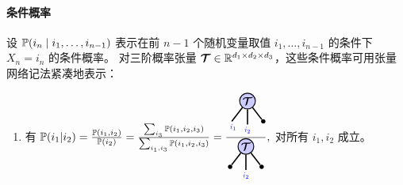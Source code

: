 \paragraph{条件概率}
设 
$\mathbb{P}(i_n \mid i_1, \dots, i_{n-1})
$
表示在前 $n-1$ 个随机变量取值 $i_1, \dots, i_{n-1}$ 的条件下 $X_n = i_n$ 的条件概率。  
对三阶概率张量 $\bm{\mathcal{T}}\in \mathbb{R}^{d_1 \times d_2 \times d_3}$，这些条件概率可用张量网络记法紧凑地表示：
\begin{enumerate}
    \item 
有 $
\PP(i_1|i_2) = \frac{\PP(i_1,i_2)}{\PP(i_2)} = \frac{\sum_{i_3}\PP(i_1,i_2,i_3)}{\sum_{i_1,i_3}\PP(i_1,i_2,i_3)} = 
\frac{\begin{tikzpicture}[baseline=\baseline]
    \tikzset{tensor/.style = {minimum size = 0.5cm,shape = circle,thick,draw=black,inner sep = 0pt}, edge/.style = {thick,line width=.4mm},every loop/.style={}}
    \def\x{0}
    \def\y{0}
    \node[tensor,fill=blue!20!white] (T) at (\x,\y) {$\Tt$};
    \draw  node[fill = black,circle,inner sep=0pt,minimum size=4pt] (m_1) at (\x+0.5,\y-0.65) {};
    \draw[edge] (T) -- (\x-0.5,\y-0.65)node [very near end,below]
    {\scalebox{0.7}{\indcolor{$i_1$}}};
    \draw[edge](T) -- (\x,\y-0.75)node [very near end,below]
    {\scalebox{0.7}{\indcolor{$i_2$}}};
    \draw[edge](T) -- (m_1);
\end{tikzpicture}}{\begin{tikzpicture}[baseline=\baseline]
    \tikzset{tensor/.style = {minimum size = 0.5cm,shape = circle,thick,draw=black,inner sep = 0pt}, edge/.style = {thick,line width=.4mm},every loop/.style={}}
    \def\x{0}
    \def\y{0}
    \node[tensor,fill=blue!20!white] (T) at (\x,\y) {$\Tt$};
    \draw  node[fill = black,circle,inner sep=0pt,minimum size=4pt] (m_1) at (\x-0.5,\y-0.65) {}; 
    \draw  node[fill = black,circle,inner sep=0pt,minimum size=4pt] (m_2) at (\x+0.5,\y-0.65) {};
    \draw[edge] (T) -- (m_1);
    \draw[edge](T) -- (m_2);
    \draw[edge](T) -- (\x,\y-0.75)node [very near end,below]
    {\scalebox{0.7}{\indcolor{$i_2$}}};
\end{tikzpicture}},
$
对所有 $i_1, i_2$ 成立。 


\end{enumerate}
